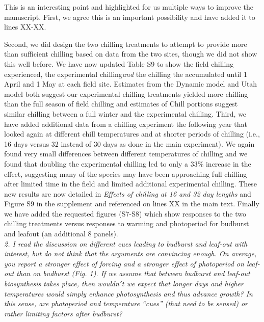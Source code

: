 \documentclass[11pt,a4paper]{article}
\begin{document}
This is an interesting point and highlighted for us multiple ways to improve the manuscript. First, we agree this is an important possibility and have added it to lines XX-XX. 

\begin{quote}
\end{quote}

Second, we did design the two chilling treatments to attempt to provide more than sufficient chilling based on data from the two sites, though we did not show this well before. We have now updated Table S9 to show the field chilling experienced, the experimental chilling\emph{and} the chilling the accumulated until 1 April and 1 May at each field site. Estimates from the Dynamic model and Utah model both suggest our experimental chilling treatments yielded more chilling than the full season of field chilling and estimates of Chill portions suggest similar chilling between a full winter and the experimental chilling. Third, we have added additional data from a chilling experiment the following year that looked again at different chill temperatures and at shorter periods of chilling (i.e., 16 days versus 32 instead of 30 days as done in the main experiment). We again found very small differences between different temperatures of chilling and we found that doubling the experimental chilling led to only a 33\% increase in the effect, suggesting many of the species may have been approaching full chilling after limited time in the field and limited additional experimental chilling. These new results are now detailed in \emph{Effects of chilling at 16 and 32 day lengths} and Figure S9 in the supplement and referenced on lines XX in the main text. Finally we have added the requested figures (S7-S8) which show responses to the two chilling treatments versus responses to warming and photoperiod for budburst and leafout (an additional 8 panels). \\

\emph{2.      I read the discussion on different cues leading to budburst and leaf-out with
interest, but do not think that the arguments are convincing enough. On average, you report a
stronger effect of forcing and a stronger effect of photoperiod on leaf-out than on budburst
(Fig. 1). If we assume that between budburst and leaf-out biosynthesis takes place, then
wouldn ́t we expect that longer days and higher temperatures would simply enhance
photosynthesis and thus advance growth? In this sense, are photoperiod and temperature “cues”
(that need to be sensed) or rather limiting factors after budburst?}\\
\end{document}
